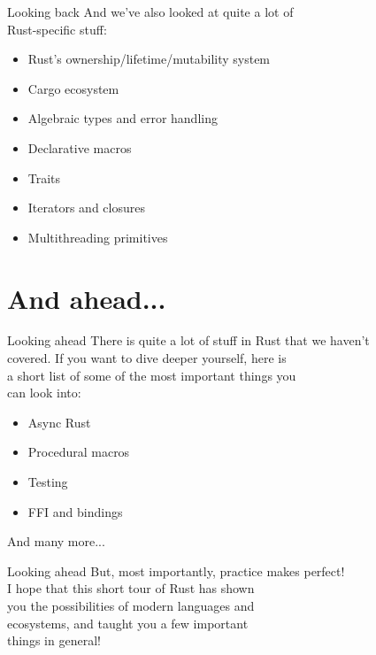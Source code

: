 \documentclass[usenames,dvipsnames,10pt,aspectratio=169]{beamer}
\begin{document}
\begin{frame}{Looking back}
	\large
	And we've also looked at quite a lot of\\
	Rust-specific stuff:
	\vspace{0.1cm}
\begin{itemize}[label=$\bullet$]
	\item Rust's ownership/lifetime/mutability system
	\item Cargo ecosystem
	\item Algebraic types and error handling
	\item Declarative macros
	\item Traits
	\item Iterators and closures
	\item Multithreading primitives
\end{itemize}
\end{frame}

\section{And ahead...}

\begin{frame}{Looking ahead}
	\large
There is quite a lot of stuff in Rust that we haven't\\
covered. If you want to dive deeper yourself, here is\\
a short list of some of the most important things you\\
can look into:
\vspace{0.2cm}
\begin{itemize}[label=$\bullet$]
	\item Async Rust
	\item Procedural macros
	\item Testing
	\item FFI and bindings
\end{itemize}
\vspace{0.2cm}
And many more...
\end{frame}

\begin{frame}{Looking ahead}
\Large
But, most importantly, practice makes perfect!\\

\vspace{0.4cm}
I hope that this short tour of Rust has shown\\
you the possibilities of modern languages and\\
ecosystems, and taught you a few important\\
things in general!
\end{frame}

\end{document}
